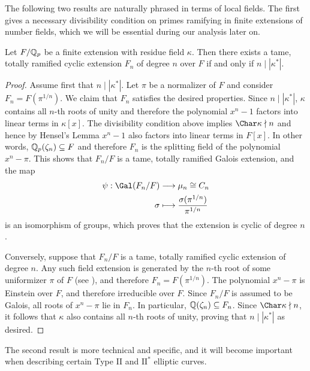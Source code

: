 The following two results are naturally phrased in terms of local fields. The first gives a necessary divisibility condition on primes ramifying in finite extensions of number fields, which we will be essential during our analysis later on.

\begin{prop}\label{prop_totally_ramified}
    Let $F/\mathbb{Q}_p$ be a finite extension with residue field $\kappa$. Then there exists a tame, totally ramified cyclic extension $F_n$ of degree $n$ over $F$ if and only if $n\mid|\kappa^*|$.
\end{prop}

\begin{proof}
    Assume first that $n\mid|\kappa^*|$. Let $\pi$ be a normalizer of $F$ and consider $F_n=F(\pi^{1/n})$. We claim that $F_n$ satisfies the desired properties. Since $n\mid|\kappa^*|$, $\kappa$ contains all $n$-th roots of unity and therefore the polynomial $x^n-1$ factors into linear terms in $\kappa[x]$. The divisibility condition above implies $\Char\kappa\nmid n$ and hence by Hensel's Lemma $x^n-1$ also factors into linear terms in $F[x]$. In other words, $\mathbb{Q}_p(\zeta_n)\subseteq F$ and therefore $F_n$ is the splitting field of the polynomial $x^n-\pi$. This shows that $F_n/F$ is a tame, totally ramified Galois extension, and the map 
    \begin{align*}
        \psi: \Gal(F_n/F)&\longrightarrow \mu_n\cong C_n\\
        \sigma &\longmapsto \frac{\sigma(\pi^{1/n})}{\pi^{1/n}}
    \end{align*}
    is an isomorphism of groups, which proves that the extension is cyclic of degree $n$.

    Conversely, suppose that $F_n/F$ is a tame, totally ramified cyclic extension of degree $n$. Any such field extension is generated by the $n$-th root of some uniformizer $\pi$ of $F$ (see \cite[Theorem 11.10]{Sun1}), and therefore $F_n=F(\pi^{1/n})$. The polynomial $x^n-\pi$ is Einstein over $F$, and therefore irreducible over $F$. Since $F_n/F$ is assumed to be Galois, all roots of $x^n-\pi$ lie in $F_n$. In particular, $\mathbb{Q}(\zeta_n)\subseteq F_n$. Since $\Char\kappa\nmid n$, it follows that $\kappa$ also contains all $n$-th roots of unity, proving that $n\mid|\kappa^*|$ as desired. 
\end{proof}

The second result is more technical and specific, and it will become important when describing certain Type II and $\mathrm{II}^*$ elliptic curves. 


